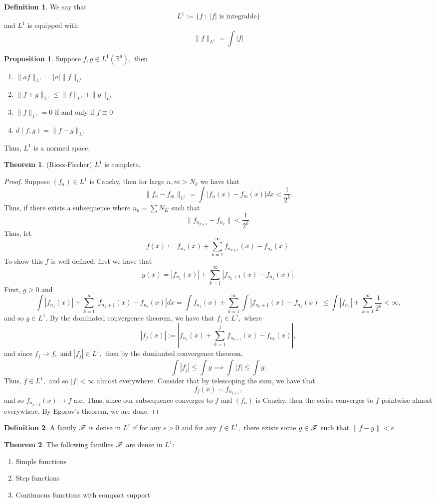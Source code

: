 \documentclass[10pt, oneside]{article}
\newcommand{\bbR}{\mathbb{R}}
\theoremstyle{definition}
\newtheorem{thm}{Theorem}
\newtheorem{defn}{Definition}
\newtheorem{prop}{Proposition}
\begin{document}
\begin{defn}
    We say that 
    \[L^1 := \{f \; : \; |f| \text{ is integrable}\}\] and $L^1$ is equipped with 
    \[\|f\|_{L^1} = \int |f |\]
\end{defn}
\begin{prop}
    Suppose $f,g \in L^1(\bbR^d),$ then 
    \begin{enumerate}
        \item $\|af\|_{L^1} = |a|\|f\|_{L^1}$
        \item $\|f + g\|_{L^1}\leq \|f\|_{L^1} + \|g\|_{L^1}$
        \item $\|f\|_{L^1} = 0$ if and only if $f \equiv 0$
        \item $d(f,g) = \|f - g\|_{L^1}$
    \end{enumerate}
\end{prop}
Thus, $L^1$ is a normed space.
\begin{thm}
    (Riesz-Fischer) $L^1$ is complete. 
\end{thm}
\begin{proof}
    Suppose $(f_n)\in L^1$ is Cauchy, then for large $n,m > N_k$ we have that 
    \[\|f_n - f_m\|_{L^1} = \int |f_n(x) - f_m(x)|dx < \frac{1}{2^k}.\] Thus, if there exists a subsequence where $n_k = \sum N_K$ such that
    \[\|f_{n_{k+1}} - f_{n_k}\| < \frac{1}{2^k}.\] Thus, let 
    \[f(x):= f_{n_1}(x) + \sum_{k=1}^\infty f_{n_{k+1}}(x) - f_{n_k}(x).\] To show this $f$ is well defined, first we have that 
    \[g(x) = |f_{n_1}(x)| + \sum_{k=1}^\infty |f_{n_k+1}(x) - f_{n_k}(x)|.\]
    First, $g\geq 0$ and 
    \[\int |f_{n_1}(x)| + \sum_{k=1}^\infty |f_{n_k+1}(x) - f_{n_k}(x)|dx= \int f_{n_1}(x) + \sum_{k=1}^\infty \int |f_{n_k+1}(x) - f_{n_k}(x)| \leq \int |f_{n_1}| + \sum_{k=1}^\infty \frac{1}{2^k} < \infty,\] and so $g\in L^1.$ By the dominated convergence theorem, we have that $f_j\in L^1,$ where 
    \[|f_j(x)|:=  \left|f_{n_1}(x) +\sum_{k=1}^j f_{n_{k+1}}(x) - f_{n_k}(x)\right|,\] and since $f_j \to f,$ and $|f_j| \in L^1,$ then by the dominated convergence theorem,
    \[\int |f_j| \leq \int g \implies \int |f| \leq \int g.\] Thus, $f\in L^1,$ and so $|f|< \infty$ almost everywhere. Consider that by telescoping the sum, we have that
    \[f_{j}(x) = f_{n_{j+1}},\] and so $f_{n_{k+1}}(x)\to f$ a.e. Thus, since our subsequence converges to $f$ and $(f_n)$ is Cauchy, then the series converges to $f$ pointwise almost everywhere. By Egorov's theorem, we are done. 
\end{proof}

\begin{defn}
    A family $\cal F$ is dense in $L^1$ if for any $\epsilon>0$ and for any $f\in L^1,$ there exists some $g\in \cal F$ such that $\|f - g\|< \epsilon.$
\end{defn}
\begin{thm}
    The following families $\cal F$ are dense in $L^1:$
    \begin{enumerate}
        \item Simple functions
        \item Step functions
        \item Continuous functions with compact support
    \end{enumerate}
\end{thm}
\end{document}
